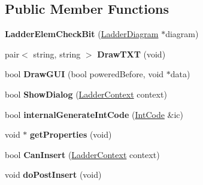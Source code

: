 \subsection*{Public Member Functions}
\begin{DoxyCompactItemize}
\item 
\hypertarget{class_ladder_elem_check_bit_a300f920d34550a52a473a906d553f2c9}{{\bfseries Ladder\-Elem\-Check\-Bit} (\hyperlink{class_ladder_diagram}{Ladder\-Diagram} $\ast$diagram)}\label{class_ladder_elem_check_bit_a300f920d34550a52a473a906d553f2c9}

\item 
\hypertarget{class_ladder_elem_check_bit_a89005c6f18b5f88858de1db0a64b1ab1}{pair$<$ string, string $>$ {\bfseries Draw\-T\-X\-T} (void)}\label{class_ladder_elem_check_bit_a89005c6f18b5f88858de1db0a64b1ab1}

\item 
\hypertarget{class_ladder_elem_check_bit_ab50ef084b81c2b227b1fc5a97d0b38a1}{bool {\bfseries Draw\-G\-U\-I} (bool powered\-Before, void $\ast$data)}\label{class_ladder_elem_check_bit_ab50ef084b81c2b227b1fc5a97d0b38a1}

\item 
\hypertarget{class_ladder_elem_check_bit_a592260a058269a68da595ee161b94593}{bool {\bfseries Show\-Dialog} (\hyperlink{struct_ladder_context}{Ladder\-Context} context)}\label{class_ladder_elem_check_bit_a592260a058269a68da595ee161b94593}

\item 
\hypertarget{class_ladder_elem_check_bit_aba768cd7355c3754219fff439265fd74}{bool {\bfseries internal\-Generate\-Int\-Code} (\hyperlink{class_int_code}{Int\-Code} \&ic)}\label{class_ladder_elem_check_bit_aba768cd7355c3754219fff439265fd74}

\item 
\hypertarget{class_ladder_elem_check_bit_af4b78435d266642950759ca4cea843b8}{void $\ast$ {\bfseries get\-Properties} (void)}\label{class_ladder_elem_check_bit_af4b78435d266642950759ca4cea843b8}

\item 
\hypertarget{class_ladder_elem_check_bit_a4ffeb46e98d7deaf8882905898c288de}{bool {\bfseries Can\-Insert} (\hyperlink{struct_ladder_context}{Ladder\-Context} context)}\label{class_ladder_elem_check_bit_a4ffeb46e98d7deaf8882905898c288de}

\item 
\hypertarget{class_ladder_elem_check_bit_a45fb3a81046f13aa400b7674ecece7ca}{void {\bfseries do\-Post\-Insert} (void)}\label{class_ladder_elem_check_bit_a45fb3a81046f13aa400b7674ecece7ca}


\end{DoxyCompactItemize}
